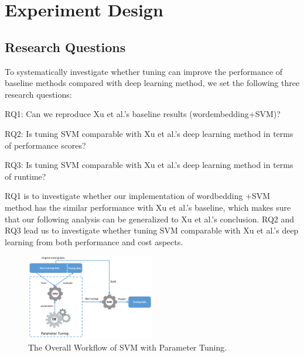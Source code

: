 \section{Experiment Design}
\subsection{Research Questions}
 To systematically investigate whether tuning can improve the 
 performance of baseline methods compared with deep learning method, we set
 the following three research questions:
 
 \bi
 \item RQ1: Can we reproduce Xu et al.'s baseline results (wordembedding+SVM)?
 \item RQ2: Is tuning SVM comparable with Xu et al.'s deep learning method in terms of performance scores?
 \item RQ3: Is tuning SVM comparable with Xu et al.'s deep learning method in terms of runtime?
 \ei
 
 RQ1 is to investigate whether our implementation of wordbedding +SVM method has
 the similar performance with Xu et al.'s baseline, which makes sure that our following 
 analysis can be generalized to Xu et al.'s conclusion. RQ2 and RQ3 lead us to
 investigate whether tuning SVM comparable with Xu et al.'s deep learning from both 
 performance and cost aspects.
 
 \begin{figure}
    \centering
    \includegraphics[width=0.5\textwidth]{pic/workflow.pdf}
    \caption{The Overall Workflow of SVM with Parameter Tuning.}
    \label{fig:workflow}
\end{figure}

